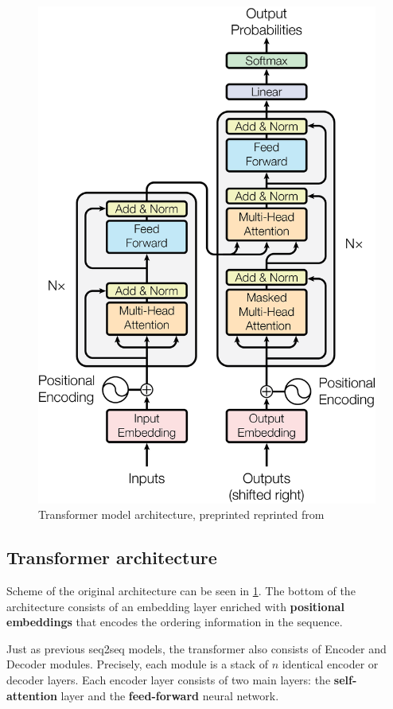 \begin{figure}
  \includegraphics[scale=0.5]{my_modules/multimedia/atalyned.png}
  \caption{Transformer model architecture, preprinted reprinted from \cite{vaswani2017attention}}
  \label{fig:transformer}
\end{figure}

\subsection{Transformer architecture}
Scheme of the original architecture can be seen in \ref{fig:transformer}. The bottom of the architecture consists of an embedding layer enriched with \textbf{positional embeddings} that encodes the ordering information in the sequence.

Just as previous seq2seq models, the transformer also consists of Encoder and Decoder modules. Precisely, each module is a stack of $n$ identical encoder or decoder layers. Each encoder layer consists of two main layers: the \textbf{self-attention} layer and the \textbf{feed-forward} neural network.


